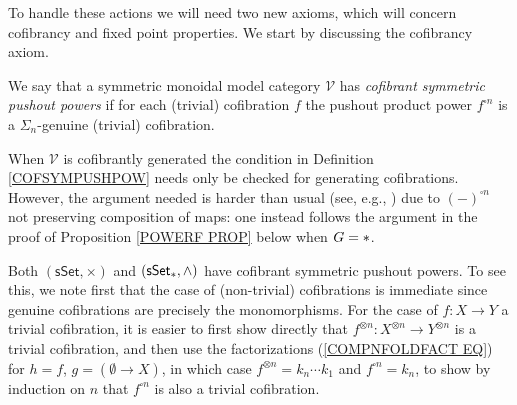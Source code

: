 \documentclass[a4paper,10pt]{article}%
\begin{document}
To handle these actions we will need two new axioms, 
which will concern cofibrancy and fixed point properties. We start by discussing the cofibrancy axiom.


\begin{definition}\label{COFSYMPUSHPOW}
	We say that a symmetric monoidal model category $\mathcal{V}$ has 
	\textit{cofibrant symmetric pushout powers}
	if for each (trivial) cofibration $f$ the pushout product power 
	$f^{\square n}$ is a $\Sigma_n$-genuine 
	(trivial) cofibration.
\end{definition}


\begin{remark}
When $\mathcal{V}$ is cofibrantly generated
the condition in Definition \ref{COFSYMPUSHPOW} needs only be checked for generating cofibrations. 
However, the argument needed is harder than usual
(see, e.g., \cite[Lemma 2.1.20]{Ho98}) due to $(-)^{\square n}$ not preserving composition of maps:
one instead follows the argument in the proof of 
Proposition \ref{POWERF PROP} below when $G=\**$.
\end{remark}



\begin{example}
	Both $(\mathsf{sSet},\times)$ and 
	$(\mathsf{sSet}_{\**},\wedge)$ have cofibrant symmetric pushout powers. To see this, we note first that the case of (non-trivial)
	cofibrations is immediate since genuine cofibrations
	are precisely the monomorphisms.
	For the case of $f \colon X \to Y$ a trivial cofibration, it is easier to first show directly that 
	$f^{\otimes n} \colon X^{\otimes n} \to Y^{\otimes n}$
	is a trivial cofibration, 
	and then use the factorizations
	(\ref{COMPNFOLDFACT EQ})
	for $h=f$, $g=(\emptyset \to X)$, 
	in which case $f^{\otimes n} = k_n\cdots k_1$ and 
	$f^{\square n} = k_n$,
	to show by induction on $n$ that 
	$f^{\square n}$ is also a trivial cofibration.
\end{example}
\end{document}
